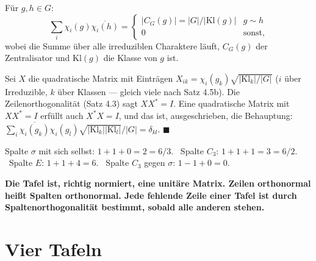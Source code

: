 \begin{merksatz}
Für $g, h\in G$:
\[ \sum_i\chi_i(g)\overline{\chi_i(h)} = \begin{cases}|C_G(g)| = |G|/|\mathrm{Kl}(g)| & g\sim h\\ 0 & \text{sonst,}\end{cases} \]
wobei die Summe über alle irreduziblen Charaktere läuft, $C_G(g)$ der Zentralisator und $\mathrm{Kl}(g)$ die Klasse von $g$ ist.

Sei $X$ die quadratische Matrix mit Einträgen $X_{ik} = \chi_i(g_k)\sqrt{|\mathrm{Kl}_k|/|G|}$ ($i$ über Irreduzible, $k$ über Klassen --- gleich viele nach Satz 4.5b). Die Zeilenorthogonalität (Satz 4.3) sagt $XX^{*} = I$. Eine quadratische Matrix mit $XX^{*} = I$ erfüllt auch $X^{*}X = I$, und das ist, ausgeschrieben, die Behauptung: $\sum_i\overline{\chi_i(g_k)}\chi_i(g_l)\sqrt{|\mathrm{Kl}_k||\mathrm{Kl}_l|}/|G| = \delta_{kl}$. $\blacksquare$

Spalte $\sigma$ mit sich selbst: $1 + 1 + 0 = 2 = 6/3$. \checkmark\ Spalte $C_3$: $1 + 1 + 1 = 3 = 6/2$. \checkmark\ Spalte $E$: $1 + 1 + 4 = 6$. \checkmark\ Spalte $C_3$ gegen $\sigma$: $1 - 1 + 0 = 0$. \checkmark

\begin{center}
\begin{minipage}{0.9\textwidth}
\textbf{Die Tafel ist, richtig normiert, eine unitäre Matrix. Zeilen orthonormal heißt Spalten orthonormal. Jede fehlende Zeile einer Tafel ist durch Spaltenorthogonalität bestimmt, sobald alle anderen stehen.}
\end{minipage}
\end{center}
\end{merksatz}

\section{Vier Tafeln}

